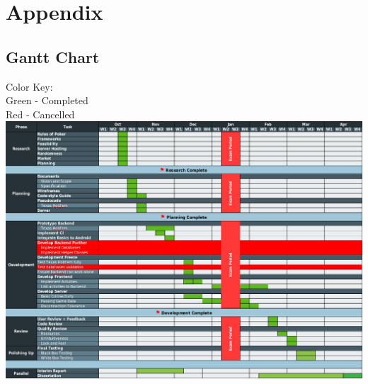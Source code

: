 \documentclass[11pt]{article}
\begin{document}






\newpage

\section{Appendix}



\subsection{Gantt Chart}

\hypertarget{app_gantt}{}
Color Key: \\
Green - Completed \\
Red - Cancelled \\

\includegraphics[width=\textwidth1]{final_gantt}
\end{document}

